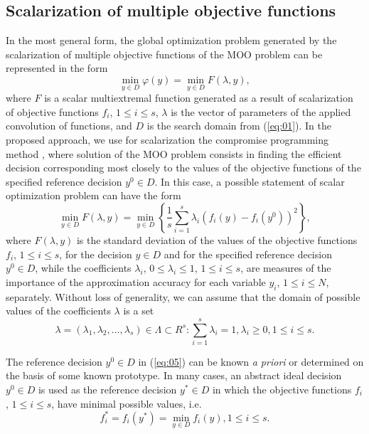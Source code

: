 \documentclass[runningheads]{llncs}
\begin{document}
\subsection{Scalarization of multiple objective functions}
\label{subsec:31}
 
In the most general form, the global optimization problem generated by the scalarization of multiple objective functions of the MOO problem can be represented in the form
\begin{equation}
\label{eq:04}
\min_{y \in D} {\varphi(y)} = \min_{y \in D} F(\lambda, y),
\end{equation}
where $F$ is a scalar multiextremal function generated as a result of scalarization of objective functions $f_i$, $1 \leq i \leq s$, $\lambda$ is the vector of parameters of the applied convolution of functions, and $D$ is the search domain from (\ref{eq:01}). In the proposed approach, we use for scalarization the compromise programming method \cite{c2,c11}, where solution of the MOO problem consists in finding the efficient decision corresponding most closely to the values of the objective functions of the specified reference decision $y^0 \in D$. In this case, a possible statement of scalar optimization problem can have the form 
\begin{equation}
\label{eq:05}
\min_{y \in D} F(\lambda,y)=\min_{y \in D} \left\{ \frac{1}{s} \sum_{i=1}^s {\lambda_i (f_i (y)-f_i (y^0 ))^2} \right\},
\end{equation}
where $F(\lambda,y)$ is the standard deviation of the values of the objective functions $f_i$, $1 \leq i \leq s$, for the decision $y \in D$ and for the specified reference decision $y^0 \in D$, while the coefficients $\lambda_i$, $0 \leq \lambda_i \leq 1$, $1 \leq i \leq s$, are measures of the importance of the approximation accuracy for each variable $y_i$, $1 \leq i \leq N$, separately. Without loss of generality, we can assume that the domain of possible values of the coefficients $\lambda$ is a set 
\begin{equation}
\label{eq:06}
\lambda=(\lambda_1,\lambda_2, \dots, \lambda_s)\in \Lambda \subset R^s: \sum_{i=1}^{s}\lambda_i=1, \lambda_i \geq 0, 1 \leq i \leq s.
\end{equation}

The reference decision $y^0 \in D$ in (\ref{eq:05}) can be known \textit{a priori} or determined on the basis of some known prototype. In many cases, an abstract ideal decision $y^0 \in D$ is used as the reference decision $y^*\in D$ in which the objective functions $f_i$, $1 \leq i \leq s$, have minimal possible values, i.e.
\begin{equation}
\label{eq:07}
f_i^* =f_i (y^*)=\min_{y \in D} f_i (y), 1 \leq i \leq s.
\end{equation}
\end{document}

